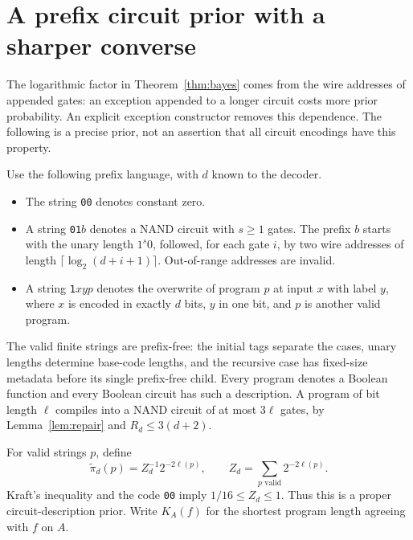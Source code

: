 \documentclass[11pt]{article}
\newcommand{\1}{\mathbf 1}
\begin{document}
\section{A prefix circuit prior with a sharper converse}

The logarithmic factor in Theorem~\ref{thm:bayes} comes from the wire
addresses of appended gates: an exception appended to a longer circuit
costs more prior probability. An explicit exception constructor removes
this dependence. The following is a precise prior, not an assertion that
all circuit encodings have this property.

Use the following prefix language, with $d$ known to the decoder.
\begin{itemize}
\item The string \texttt{00} denotes constant zero.
\item A string \texttt{01}$b$ denotes a NAND circuit with $s\ge1$ gates.
The prefix $b$ starts with the unary length $1^s0$, followed, for each
gate $i$, by two wire addresses of length
$\lceil\log_2(d+i+1)\rceil$. Out-of-range addresses are invalid.
\item A string \texttt{1}$xyp$ denotes the overwrite of program $p$ at
input $x$ with label $y$, where $x$ is encoded in exactly $d$ bits, $y$
in one bit, and $p$ is another valid program.
\end{itemize}
The valid finite strings are prefix-free: the initial tags separate the
cases, unary lengths determine base-code lengths, and the recursive case
has fixed-size metadata before its single prefix-free child. Every
program denotes a Boolean function and every Boolean circuit has such a
description. A program of bit length $\ell$ compiles into a NAND circuit
of at most $3\ell$ gates, by Lemma~\ref{lem:repair} and
$R_d\le3(d+2)$.

For valid strings $p$, define
\begin{equation}\label{eq:prefixprior}
 \widetilde\pi_d(p)=Z_d^{-1}2^{-2\ell(p)},\qquad
 Z_d=\sum_{p\text{ valid}}2^{-2\ell(p)}.
\end{equation}
Kraft's inequality and the code \texttt{00} imply
$1/16\le Z_d\le1$. Thus this is a proper circuit-description prior.
Write $K_A(f)$ for the shortest program length agreeing with $f$ on $A$.
\end{document}
